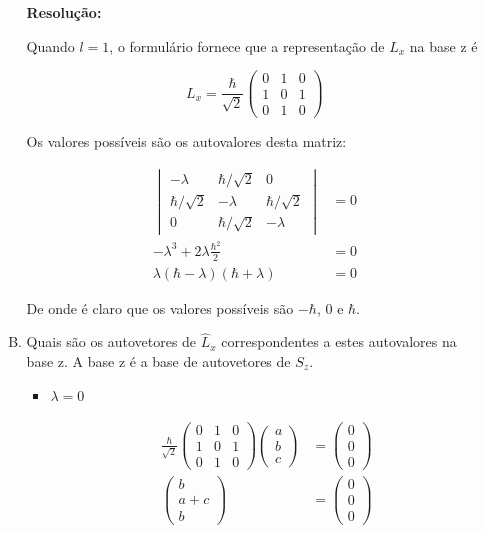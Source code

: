 \documentclass[a4paper, 12pt, notitlepage]{article}
\begin{document}
\begin{enumerate}
\begin{enumerate}[(A)]
  \textbf{Resolução:}
  
  Quando $l=1$, o formulário fornece que a representação de $L_x$ na base z é
  
  \[
  L_x = \frac{\hbar}{\sqrt{2}}\begin{pmatrix}
  0 & 1 & 0 \\
  1 & 0 & 1 \\
  0 & 1 & 0
  \end{pmatrix}
  \]
  
  Os valores possíveis são os autovalores desta matriz:
  
  \begin{align*}
  \begin{vmatrix}
  -\lambda & \hbar/\sqrt{2} & 0 \\
  \hbar/\sqrt{2} & -\lambda & \hbar/\sqrt{2} \\
  0 & \hbar/\sqrt{2} & -\lambda
  \end{vmatrix} &= 0 \\
  -\lambda^3 + 2\lambda \frac{\hbar^2}{2} &= 0 \\
  \lambda\left(\hbar - \lambda\right)\left(\hbar + \lambda\right) &= 0
  \end{align*}
  
  De onde é claro que os valores possíveis são $-\hbar$, $0$ e $\hbar$.
  
  \item Quais são os autovetores de $\hat{L}_x$ correspondentes a estes autovalores na base z. A base z é a base de autovetores de $S_z$.
  
  \begin{itemize}
    \item $\lambda = 0$
    
\begin{align*}
    \frac{\hbar}{\sqrt{2}}\begin{pmatrix}
    0 & 1 & 0 \\
    1 & 0 & 1 \\
    0 & 1 & 0
    \end{pmatrix}
    \begin{pmatrix}
    a \\ b \\ c
    \end{pmatrix} &= \begin{pmatrix} 0 \\ 0 \\ 0 \end{pmatrix} \\
    \begin{pmatrix}
    b \\ a + c \\ b
    \end{pmatrix} &= \begin{pmatrix}
    0 \\ 0 \\ 0
    \end{pmatrix}
\end{align*}


\end{itemize}
\end{enumerate}
\end{enumerate}
\end{document}
